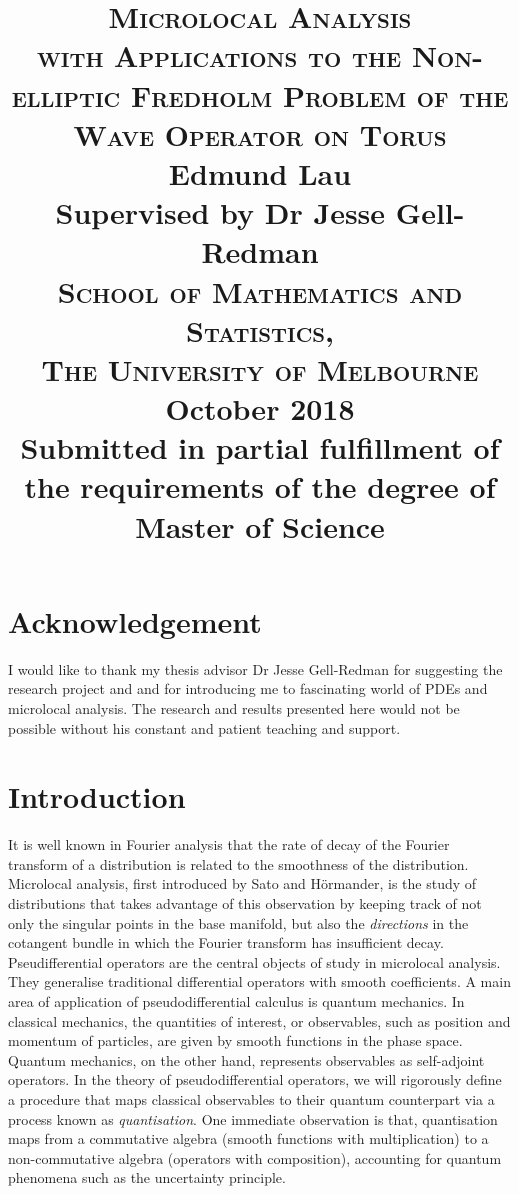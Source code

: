 \documentclass[12pt, twoside]{book}
\title{    
    \textsc{\LARGE \textbf{Microlocal Analysis}} \\
    \textsc{\large \textbf{with Applications to the Non-elliptic Fredholm Problem of the Wave Operator on Torus}} \\ [5em]
    Edmund Lau \\
    Supervised by Dr Jesse Gell-Redman \\ [5em] 
    \textsc{\Large School of Mathematics and Statistics, \\ The University of Melbourne} \\ [5em]
    {\large October 2018} \\
    {\large Submitted in partial fulfillment of the requirements of the degree of Master of Science} \\
}
\date{}
\begin{document}
\maketitle



\chapter*{Acknowledgement}
I would like to thank my thesis advisor Dr Jesse Gell-Redman for suggesting the research project and and for introducing me to fascinating world of PDEs and microlocal analysis. The research and results presented here would not be possible without his constant and patient teaching and support. 


\tableofcontents

\chapter{Introduction}

It is well known in Fourier analysis that the rate of decay of the Fourier transform of a distribution is related to the smoothness of the distribution. Microlocal analysis, first introduced by  Sato \cite{Sato1970-on} and H\"ormander\cite{Hormander2007-ws}, is the study of distributions that takes advantage of this observation by keeping track of not only the singular points in the base manifold, but also the \textit{directions} in the cotangent bundle in which the Fourier transform has insufficient decay. \\

Pseudifferential operators are the central objects of study in microlocal analysis. They generalise traditional differential operators with smooth coefficients. A main area of application of pseudodifferential calculus is quantum mechanics\cite{Martinez2002-xg}. In classical  mechanics,  the quantities of interest, or  observables,  such as position and momentum of particles, are given by smooth functions in the phase space. Quantum mechanics, on the other hand, represents observables as self-adjoint operators. In the theory of pseudodifferential operators, we will rigorously define a procedure that maps classical observables to their quantum counterpart via a process known as \textit{quantisation}. One immediate observation is that, quantisation maps from a commutative algebra (smooth functions with multiplication) to a non-commutative algebra (operators with composition), accounting for quantum phenomena such as the uncertainty principle. \\
\end{document}
